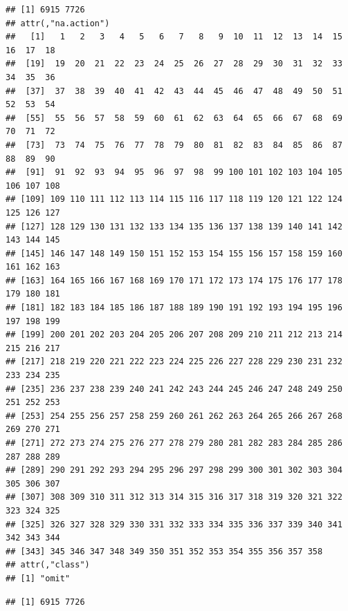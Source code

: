 \documentclass[
  10pt,
  b5paper,
  oneside]{book}
\newenvironment{Shaded}{\begin{snugshade}}{\end{snugshade}}
\newcommand{\DecValTok}[1]{\textcolor[rgb]{0.00,0.00,0.81}{#1}}
\newcommand{\FunctionTok}[1]{\textcolor[rgb]{0.00,0.00,0.00}{#1}}
\newcommand{\NormalTok}[1]{#1}
\newcommand{\SpecialCharTok}[1]{\textcolor[rgb]{0.00,0.00,0.00}{#1}}
\begin{document}
\begin{verbatim}
## [1] 6915 7726
## attr(,"na.action")
##   [1]   1   2   3   4   5   6   7   8   9  10  11  12  13  14  15  16  17  18
##  [19]  19  20  21  22  23  24  25  26  27  28  29  30  31  32  33  34  35  36
##  [37]  37  38  39  40  41  42  43  44  45  46  47  48  49  50  51  52  53  54
##  [55]  55  56  57  58  59  60  61  62  63  64  65  66  67  68  69  70  71  72
##  [73]  73  74  75  76  77  78  79  80  81  82  83  84  85  86  87  88  89  90
##  [91]  91  92  93  94  95  96  97  98  99 100 101 102 103 104 105 106 107 108
## [109] 109 110 111 112 113 114 115 116 117 118 119 120 121 122 124 125 126 127
## [127] 128 129 130 131 132 133 134 135 136 137 138 139 140 141 142 143 144 145
## [145] 146 147 148 149 150 151 152 153 154 155 156 157 158 159 160 161 162 163
## [163] 164 165 166 167 168 169 170 171 172 173 174 175 176 177 178 179 180 181
## [181] 182 183 184 185 186 187 188 189 190 191 192 193 194 195 196 197 198 199
## [199] 200 201 202 203 204 205 206 207 208 209 210 211 212 213 214 215 216 217
## [217] 218 219 220 221 222 223 224 225 226 227 228 229 230 231 232 233 234 235
## [235] 236 237 238 239 240 241 242 243 244 245 246 247 248 249 250 251 252 253
## [253] 254 255 256 257 258 259 260 261 262 263 264 265 266 267 268 269 270 271
## [271] 272 273 274 275 276 277 278 279 280 281 282 283 284 285 286 287 288 289
## [289] 290 291 292 293 294 295 296 297 298 299 300 301 302 303 304 305 306 307
## [307] 308 309 310 311 312 313 314 315 316 317 318 319 320 321 322 323 324 325
## [325] 326 327 328 329 330 331 332 333 334 335 336 337 339 340 341 342 343 344
## [343] 345 346 347 348 349 350 351 352 353 354 355 356 357 358
## attr(,"class")
## [1] "omit"
\end{verbatim}

\begin{Shaded}
\end{Shaded}

\begin{verbatim}
## [1] 6915 7726
\end{verbatim}
\end{document}
